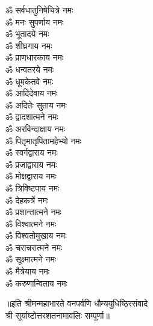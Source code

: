 \begin{multicols}{2}
\begin{flushleft}
ॐ सर्वधातुनिषेचित्रे नमः\\
ॐ मनः सुपर्णाय नमः\\
ॐ भूतादये नमः\\
ॐ शीघ्रगाय नमः\hfill{}\\
ॐ प्राणधारकाय नमः\\
ॐ धन्वतरये नमः\\
ॐ धूमकेतवे नमः\\
ॐ आदिदेवाय नमः\\
ॐ अदितेः सुताय नमः\\
ॐ द्वादशात्मने नमः\\
ॐ अरविन्दाक्षाय नमः\\
ॐ पितृमातृपितामहेभ्यो नमः\\
ॐ स्वर्गद्वाराय नमः\\
ॐ प्रजाद्वाराय नमः\hfill{}\\
ॐ मोक्षद्वाराय नमः\\
ॐ त्रिविष्टपाय नमः\\
ॐ देहकर्त्रे नमः\\
ॐ प्रशान्तात्मने नमः\\
ॐ विश्वात्मने नमः\\
ॐ विश्वतोमुखाय नमः\\
ॐ चराचरात्मने नमः\\
ॐ सूक्ष्मात्मने नमः\\
ॐ मैत्रेयाय नमः\\
ॐ करुणान्विताय नमः\hfill{}\\
\end{flushleft}
\end{multicols}
॥इति श्रीमन्महाभारते वनपर्वणि धौम्ययुधिष्ठिरसंवादे\\श्री सूर्याष्टोत्तरशतनामावलिः सम्पूर्णा॥
